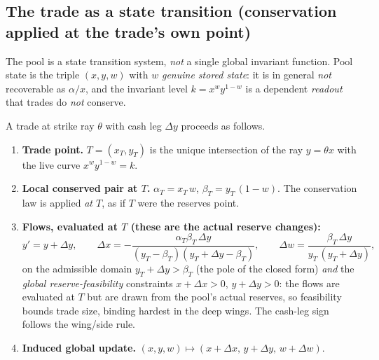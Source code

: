 \documentclass[11pt]{article}
\begin{document}
\subsection{The trade as a state transition (conservation applied at the trade's own point)}
\label{sec:transition}
The pool is a state transition system, \emph{not} a single global invariant
function. Pool state is the triple $(x,y,w)$ with $w$ \emph{genuine stored
state}: it is in general \emph{not} recoverable as $\alpha/x$, and the invariant
level $k=x^{w}y^{1-w}$ is a dependent \emph{readout} that trades do \emph{not}
conserve.

A trade at strike ray $\theta$ with cash leg $\Delta y$ proceeds as follows.
\begin{enumerate}[leftmargin=2em]
  \item \textbf{Trade point.} $T=(x_T,y_T)$ is the unique intersection of the ray
        $y=\theta x$ with the live curve $x^{w}y^{1-w}=k$.
  \item \textbf{Local conserved pair at $T$.} $\alpha_T=x_T\,w$,
        $\beta_T=y_T\,(1-w)$. The conservation law is applied \emph{at $T$}, as if
        $T$ were the reserves point.
  \item \textbf{Flows, evaluated at $T$ (these are the actual reserve changes):}
        \begin{equation}
          y'=y+\Delta y,\qquad
          \Delta x=-\frac{\alpha_T\beta_T\,\Delta y}
                          {(y_T-\beta_T)(y_T+\Delta y-\beta_T)},\qquad
          \Delta w=\frac{\beta_T\,\Delta y}{y_T\,(y_T+\Delta y)},
          \label{eq:trade}
        \end{equation}
        on the admissible domain $y_T+\Delta y>\beta_T$ (the pole of the closed
        form) \emph{and} the \emph{global reserve-feasibility} constraints
        $x+\Delta x>0$, $y+\Delta y>0$: the flows are evaluated at $T$ but are
        drawn from the pool's actual reserves, so feasibility bounds trade size,
        binding hardest in the deep wings. The cash-leg sign follows the wing/side
        rule.
  \item \textbf{Induced global update.} $(x,y,w)\mapsto(x+\Delta x,\,y+\Delta y,\,
        w+\Delta w)$.
\end{enumerate}
\end{document}
